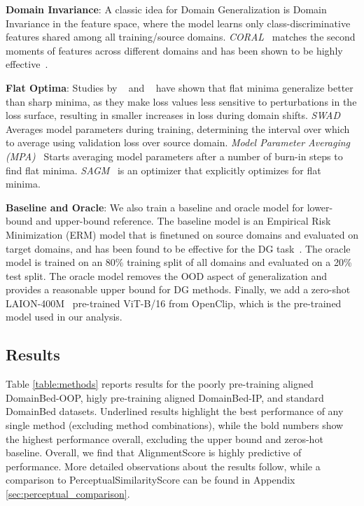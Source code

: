\documentclass{article} %
\begin{document}
\textbf{Domain Invariance}: A classic idea for Domain Generalization is Domain Invariance in the feature space, where the model learns only class-discriminative features shared among all training/source domains. \emph{CORAL}~\citep{sun2016deep} matches the second moments of features across different domains and has been shown to be highly effective~\citep{gulrajani2020search}.   
    
\textbf{Flat Optima}: Studies by ~\citet{izmailov2018averaging} and ~\citet{cha2021swad} have shown that flat minima generalize better than sharp minima, as they make loss values less sensitive to perturbations in the loss surface, resulting in smaller increases in loss during domain shifts. \emph{SWAD}~\citep{cha2021swad} Averages model parameters during training, determining the interval over which to average using validation loss over source domain. \emph{Model Parameter Averaging (MPA)}~\citep{arpit2022ensemble} Starts averaging model parameters after a number of burn-in steps to find flat minima. \emph{SAGM}~\citep{wang2023sharpness} is an optimizer that explicitly optimizes for flat minima. 

\textbf{Baseline and Oracle}: We also train a baseline and oracle model for lower-bound and upper-bound reference. The baseline model is an Empirical Risk Minimization (ERM) model that is finetuned on source domains and evaluated on target domains, and has been found to be effective for the DG task~\citep{gulrajani2020search}. The oracle model is trained on an 80\% training split of all domains and evaluated on a 20\% test split. The oracle model removes the OOD aspect of generalization and provides a reasonable upper bound for DG methods. Finally, we add a zero-shot LAION-400M~\citep{Schuhmann2021LAION400MOD} pre-trained ViT-B/16 from OpenClip, which is the pre-trained model used in our analysis.  
    
\subsection{Results}
\label{sec:results}
Table \ref{table:methods} reports results for the poorly pre-training aligned   DomainBed-OOP,  higly pre-training aligned DomainBed-IP, and standard DomainBed datasets.  Underlined results highlight the best performance of any single method (excluding method combinations), while the bold numbers show the highest performance overall, excluding the upper bound and zeros-hot baseline. Overall, we find that AlignmentScore is highly predictive of performance. More detailed observations about the results follow, while a comparison to PerceptualSimilarityScore can be found in Appendix  \ref{sec:perceptual_comparison}.
\end{document}
